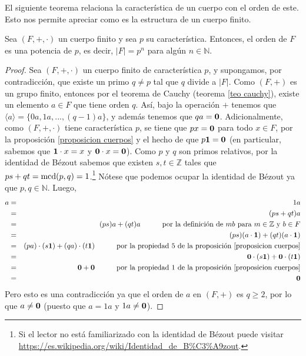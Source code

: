 El siguiente teorema relaciona la característica de un cuerpo con el
orden de este. Esto nos permite apreciar como es la estructura de un
cuerpo finito.
\begin{theorem}\label{orden cuerpo pot carac}
	Sea $(F,+,\cdot)$ un cuerpo finito y sea $p$ su
	característica. Entonces, el orden de $F$ es una potencia de
	$p$, es decir, $|F|=p^n$ para algún $n\in \mathbb{N}$.
\end{theorem}

\begin{proof}
Sea $(F,+,\cdot)$ un cuerpo finito de característica $p$, y
supongamos, por contradicción, que existe un primo $q\neq p$ tal que
$q$ divide a $|F|$. Como $(F,+)$ es un grupo finito, entonces por el
teorema de Cauchy (teorema \ref{teo cauchy}), existe un elemento $a\in
F$ que tiene orden $q$. Así, bajo la operación $+$ tenemos que
$\langle a\rangle = \{ 0 a, 1 a,...,(q-1) a\}$, y además tenemos que
$q a = \mathbf{0}$.
Adicionalmente, como $(F,+,\cdot)$ tiene característica $p$, se tiene
que $p x = \mathbf{0} $ para todo $x \in F$, por la
proposición \ref{proposicion cuerpos} y el hecho de que $p \mathbf{1} =\mathbf{0} $
(en particular, sabemos que $\mathbf{1} \cdot x = x$ y $\mathbf{0} \cdot x
= \mathbf{0}$). Como $p$ y $q$ son primos relativos, por la identidad de
Bézout sabemos que existen $s,t\in \mathbb{Z}$ tales que $p s + q t
= {\rm mcd}(p,q) = 1$.\footnote{Si el lector no está familiarizado con la
identidad de Bézout puede
visitar \url{https://es.wikipedia.org/wiki/Identidad_de_B\%C3\%A9zout}.}
Nótese que podemos ocupar la identidad de Bézout ya que
$p,q\in\mathbb{N}$.
Luego,
\begin{eqnarray*}
	a &=& 1a\\
        &=& (p s + q t) a\\
        &=& (p s) a + (q t) a \quad\quad\quad \text{por la definición de $m b$ para $m \in \mathbb{Z}$ y $b \in F$}\\
        &=& (p s) (a \cdot \mathbf{1}) + (q t) (a \cdot \mathbf{1})\\
	&=& (pa) \cdot (s\mathbf{1}) + (qa)\cdot (t\mathbf{1}) \quad\quad\quad \text{por la propiedad 5 de la proposición \ref{proposicion cuerpos}}\\
	&=& \mathbf{0} \cdot (s\mathbf{1}) + \mathbf{0} \cdot (t\mathbf{1})\\
	&=& \mathbf{0} + \mathbf{0} \quad\quad\quad \text{por la propiedad 1 de la proposición \ref{proposicion cuerpos}}\\
        &=& \mathbf{0}
\end{eqnarray*}
Pero esto es una contradicción ya que el orden de $a$ en $(F,+)$ es
$q\geq 2$, por lo que $a \neq \mathbf{0}$ (puesto que $a = 1a$ y $1a \neq \mathbf{0}$).
\end{proof}

